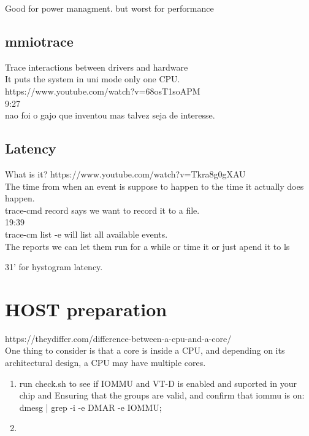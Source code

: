 \documentclass[11pt, a4paper, oneside]{article}
\theoremstyle{definition}
\begin{document}
Good for power managment. but worst for performance\\


\vfill
\pagebreak
\subsection{mmiotrace}

Trace interactions between drivers and hardware\\
It puts the system in uni mode only one CPU.\\

https://www.youtube.com/watch?v=68osT1soAPM\\
9:27\\
nao foi o gajo que inventou mas talvez seja de interesse.\\

\vfill
\pagebreak
\subsection{Latency}
What is it? https://www.youtube.com/watch?v=Tkra8g0gXAU\\
The time from when an event is suppose to happen to the time it actually does happen.\\

trace-cmd record says we want to record it to a file.\\ 
19:39\\
trace-cm list -e will list all available events.\\

The reports we can let them run for a while or time it or just apend it to ls

31' for hystogram latency.\\

\vfill
\pagebreak
\section{HOST preparation}
https://theydiffer.com/difference-between-a-cpu-and-a-core/\\
One thing to consider is that a core is inside a CPU, and depending on its architectural design, a CPU may have multiple cores.\\

\begin{enumerate}
	\item run check.sh to see if IOMMU and VT-D is enabled and suported in your chip and Ensuring that the groups are valid, and confirm that iommu is on: dmesg | grep -i -e DMAR -e IOMMU;
	\item 
\end{enumerate}
\end{document}

